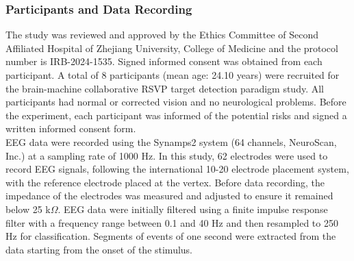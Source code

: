 \documentclass[preprint,12pt,authoryear]{elsarticle}
\begin{document}
\subsubsection{Participants and Data
Recording}
The study was reviewed and approved by the 	
Ethics Committee of Second Affiliated Hospital of Zhejiang University, College of Medicine and the protocol number is IRB-2024-1535. Signed informed consent was obtained from each participant.
A total of 8 participants (mean age: 24.10 years) were recruited for
the brain-machine collaborative RSVP target detection paradigm study.
All participants had normal or corrected vision and no neurological
problems. Before the experiment, each participant was informed of the
potential risks and signed a written informed consent form.\\
EEG data were recorded using the Synamps2 system (64 channels,
NeuroScan, Inc.) at a sampling rate of 1000 Hz. In this study, 62
electrodes were used to record EEG signals, following the
international 10-20 electrode placement system, with the reference
electrode placed at the vertex. Before data recording, the impedance
of the electrodes was measured and adjusted to ensure it remained below
25 k$\Omega$. EEG data were initially filtered using a finite impulse response filter with a frequency range between 0.1 and 40 Hz and
then resampled to 250 Hz for classification. Segments of events of
one second were extracted from the data starting from the onset of the
stimulus.
\end{document}

